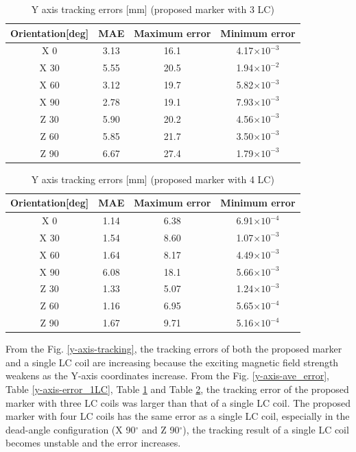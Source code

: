 \documentclass[journal,twoside,web]{ieeecolor}
\begin{document}
\begin{table}[t]
  \begin{center}
  \caption{Y axis tracking errors [mm] (proposed marker with 3 LC)}
  \label{y-axis-error_3LC}
  \begin{tabular}{c||c|c|c} \hline
    Orientation[deg] & MAE & Maximum error & Minimum error\\ \hline\hline
    X 0 & 3.13 & 16.1 & 4.17$\times10^{-3}$ \\
    X 30 & 5.55 & 20.5 & 1.94$\times10^{-2}$ \\
    X 60 & 3.12 & 19.7 & 5.82$\times10^{-3}$ \\
    X 90 & 2.78 & 19.1 & 7.93$\times10^{-3}$  \\
    Z 30 & 5.90 & 20.2 & 4.56$\times10^{-3}$ \\
    Z 60 & 5.85 & 21.7 & 3.50$\times10^{-3}$ \\
    Z 90 & 6.67 & 27.4 & 1.79$\times10^{-3}$ \\
  \end{tabular}
  \end{center}
\end{table}

\begin{table}[t]
  \begin{center}
  \caption{Y axis tracking errors [mm] (proposed marker with 4 LC)}
  \label{y-axis-error_4LC}
  \begin{tabular}{c||c|c|c} \hline
    Orientation[deg] & MAE & Maximum error & Minimum error\\ \hline\hline
    X 0 & 1.14 & 6.38 & 6.91$\times10^{-4}$ \\
    X 30 & 1.54 & 8.60 & 1.07$\times10^{-3}$ \\
    X 60 & 1.64 & 8.17 & 4.49$\times10^{-3}$ \\
    X 90 & 6.08 & 18.1 & 5.66$\times10^{-3}$  \\
    Z 30 & 1.33 & 5.07 & 1.24$\times10^{-3}$ \\
    Z 60 & 1.16 & 6.95 & 5.65$\times10^{-4}$ \\
    Z 90 & 1.67 & 9.71 & 5.16$\times10^{-4}$ \\
  \end{tabular}
  \end{center}
\end{table}

From the Fig. \ref{y-axis-tracking}, the tracking errors of both the proposed marker and a single LC coil are increasing because the exciting magnetic field strength weakens as the Y-axis coordinates increase. From the Fig. \ref{y-axis-ave_error}, Table \ref{y-axis-error_1LC}, Table \ref{y-axis-error_3LC} and Table \ref{y-axis-error_4LC}, the tracking error of the proposed marker with three LC coils was larger than that of a single LC coil. The proposed marker with four LC coils has the same error as a single LC coil, especially in the dead-angle configuration (X 90$^\circ$ and Z 90$^\circ$), the tracking result of a single LC coil becomes unstable and the error increases. 
\end{document}
